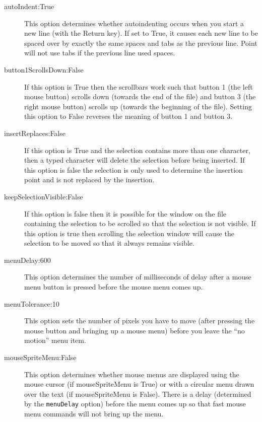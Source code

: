 \begin{description}

\item[autoIndent:True]
This option determines whether autoindenting occurs when you
start a new line (with the Return key).
If set to True, it causes each new line to be spaced over by exactly the
same spaces and tabs as the previous line.
Point will not use tabs if the previous line used spaces.

\item[button1ScrollsDown:False]
If this option is True then the scrollbars work such that
button 1 (the left mouse button) scrolls
down (towards the end of the file) and button 3 (the right mouse
button) scrolls up (towards the beginning of the file).
Setting this option to False reverses the meaning of button 1
and button 3.

\item[insertReplaces:False]
If this option is True and the selection contains more than one
character, then a typed character will delete the selection
before being inserted.
If this option is false the selection is only used to determine
the insertion point and is not replaced by the insertion.

\item[keepSelectionVisible:False]
If this option is false then it is possible for the window on
the file containing the selection to be scrolled so that the
selection is not visible.
If this option is true then scrolling the selection window
will cause the selection to be moved so that it always remains
visible.

\item[menuDelay:600]
This option determines the number of milliseconds of delay
after a mouse menu button is pressed before the mouse menu
comes up.

\item[menuTolerance:10]
This option sets the number of pixels you have to move (after pressing
the mouse button and bringing up a mouse menu) before you leave the
``no motion'' menu item.

\item[mouseSpriteMenu:False]
This option determines whether mouse menus are displayed using
the mouse cursor (if mouseSpriteMenu is True) or with a circular
menu drawn over the text (if mouseSpriteMenu is False).
There is a delay (determined by the {\tt menuDelay} option)
before the menu comes up
so that fast mouse menu commands will not bring up the menu.


\end{description}
